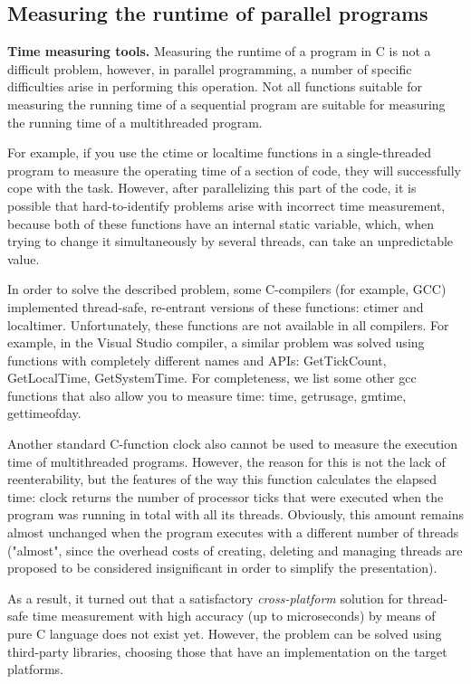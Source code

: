 { %
	\subsection{Measuring the runtime of parallel programs}
	\par\textbf{Time measuring tools.} Measuring the runtime of a program in C is not a difficult problem, however, in parallel programming, a number of specific difficulties arise in performing this operation. Not all functions suitable for measuring the running time of a sequential program are suitable for measuring the running time of a multithreaded program.
	\par For example, if you use the ctime or localtime functions in a single-threaded program to measure the operating time of a section of code, they will successfully cope with the task. However, after parallelizing this part of the code, it is possible that hard-to-identify problems arise with incorrect time measurement, because both of these functions have an internal static variable, which, when trying to change it simultaneously by several threads, can take an unpredictable value.
	\par In order to solve the described problem, some C-compilers (for example, GCC) implemented thread-safe, re-entrant versions of these functions: ctime\textunderscore r and localtime\textunderscore r. Unfortunately, these functions are not available in all compilers. For example, in the Visual Studio compiler, a similar problem was solved using functions with completely different names and APIs: GetTickCount, GetLocalTime, GetSystemTime. For completeness, we list some other gcc functions that also allow you to measure time: time, getrusage, gmtime, gettimeofday.
	\par Another standard C-function clock also cannot be used to measure the execution time of multithreaded programs. However, the reason for this is not the lack of reenterability, but the features of the way this function calculates the elapsed time: clock returns the number of processor ticks that were executed when the program was running in total with all its threads. Obviously, this amount remains almost unchanged when the program executes with a different number of threads ("almost"{}, since the overhead costs of creating, deleting and managing threads are proposed to be considered insignificant in order to simplify the presentation).
	\par As a result, it turned out that a satisfactory \textit{cross-platform} solution for thread-safe time measurement with high accuracy (up to microseconds) by means of pure C language does not exist yet. However, the problem can be solved using third-party libraries, choosing those that have an implementation on the target platforms.
}
